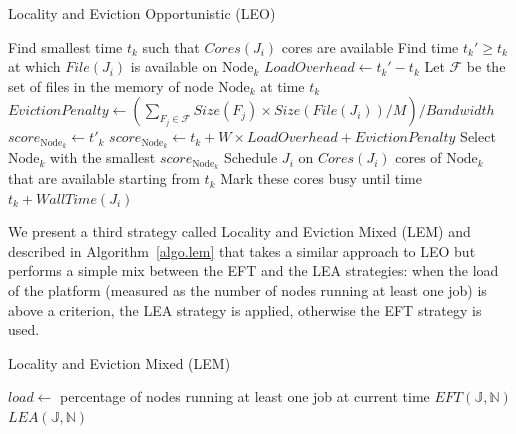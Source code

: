 \documentclass[conference,10pt]{IEEEtran}
\newcommand{\Node}[1]{\ensuremath{\mathrm{Node}_{#1}}\xspace}
\newcommand{\file}{\ensuremath{\mathit{File}}\xspace}
\newcommand{\size}{\ensuremath{\mathit{Size}}\xspace}
\newcommand{\memory}{\ensuremath{\mathit{M}}\xspace}
\newcommand{\bandwidth}{\mathit{Bandwidth}\xspace}
\newcommand{\core}{\mathit{Cores}\xspace}
\newcommand{\walltime}{\mathit{WallTime}\xspace}
\newcommand{\jobset}{\ensuremath{\mathbb{J}}\xspace}
\newcommand{\nodeset}{\ensuremath{\mathbb{N}}\xspace}
\begin{document}
\begin{algorithm}[t]%
\caption{Locality and Eviction Opportunistic (LEO)}\label{algo.leo}
\begin{algorithmic}[1]
		\ForEach{$\Node{k} \in \nodeset$}
			\State Find smallest time $t_k$ such that $\core(J_i)$ cores are available
			\State Find time $t_k'\geq t_k$ at which $\file(J_i)$ is available on $\Node{k}$
			\State $\mathit{LoadOverhead} \gets t_k' - t_k$ %
                        \State Let $\mathcal{F}$ be the set of files in the memory of node \Node{k} at time $t_k$
			\State $\mathit{EvictionPenalty} \gets (\sum_{F_j\in\mathcal{F}}\size(F_j) \times \size(\file(J_i))/\memory)/\bandwidth$
				\State $score_{\Node{k}} \gets t'_k$
			\Else
			         \State $score_{\Node{k}} \gets t_k + W \times \mathit{LoadOverhead} + \mathit{EvictionPenalty}$
			\EndIf
		\EndFor
                \State Select \Node{k} with the smallest $score_{\Node{k}}$
                \State Schedule $J_i$ on $\core(J_i)$ cores of \Node{k} that are available starting from $t_k$
                \State Mark these cores busy until time $t_k +\walltime(J_i)$
	\EndFor
\end{algorithmic}
\end{algorithm}

We present a third strategy called Locality and Eviction Mixed (LEM)
and described in Algorithm~\ref{algo.lem} that takes a similar approach to
LEO but performs a simple mix between the EFT and the LEA strategies:
when the load of the platform (measured as the number of nodes running
at least one job) is above a criterion, the LEA strategy is applied,
otherwise the EFT strategy is used.
 

\begin{algorithm}[htbp]%
\caption{Locality and Eviction Mixed (LEM)}\label{algo.lem}
\begin{algorithmic}[1]
		\State $\mathit{load} \gets$  percentage of nodes running at least one job at current time
			\State $EFT(\jobset,\nodeset)$
		\Else
			\State $LEA(\jobset,\nodeset)$
		\EndIf
	\EndFor
\end{algorithmic}
\end{algorithm}
\end{document}
